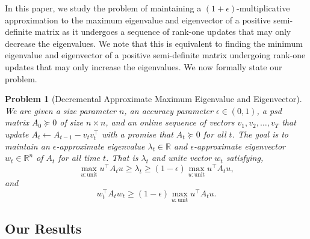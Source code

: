 \documentclass[11pt]{article}
\newtheorem{problem}[theorem]{Problem}
\newcommand\uu{\boldsymbol{\mathit{u}}}
\newcommand\vv{\boldsymbol{\mathit{v}}}
\newcommand\ww{\boldsymbol{\mathit{w}}}
\renewcommand\AA{\boldsymbol{\mathit{A}}}
\begin{document}
In this paper, we study the problem of maintaining a $(1+\epsilon)$-multiplicative approximation to the maximum eigenvalue and eigenvector of a positive semi-definite matrix as it undergoes a sequence of rank-one updates that may only decrease the eigenvalues. We note that this is equivalent to finding the minimum eigenvalue and eigenvector of a positive semi-definite matrix undergoing rank-one updates that may only increase the eigenvalues.
We now formally state our problem.
\begin{problem}
	[Decremental Approximate Maximum Eigenvalue and Eigenvector]\label{prob:dyn}We are given a size parameter $n$, an accuracy parameter $\epsilon\in(0,1)$, a psd matrix $\AA_{0}\succeq0$ of size $n\times n$, and an online sequence of vectors $\vv_{1},\vv_{2},\dots,\vv_{T}$ that update $\AA_{t}\gets \AA_{t-1}-\vv_{t}\vv_{t}^{\top}$ with a promise that $\AA_{t}\succeq0$ for all $t$. 
	The goal is to maintain an $\epsilon$-approximate eigenvalue $\lambda_{t}\in\mathbb{R}$ and $\epsilon$-approximate eigenvector $\ww_{t}\in\mathbb{R}^{n}$ of $\AA_{t}$ for all time $t$. That is $\lambda_t$ and unite vector $\ww_t$ satisfying,
	\begin{equation}\label{eq:epsEigvalue}
	\max_{\uu:\textrm{unit}}\uu^{\top}\AA_{t}\uu \ge \lambda_{t} \ge (1-\epsilon)\max_{\uu:\textrm{unit}}\uu^{\top}\AA_{t}\uu,
	\end{equation}
	and
	\begin{equation}\label{eq:epsEigvec}
	\ww_{t}^{\top}\AA_{t}\ww_{t}\ge(1-\epsilon)\max_{\uu:\textrm{unit}}\uu^{\top}\AA_{t}\uu.
	\end{equation}
\end{problem}



\subsection{Our Results}
\end{document}
